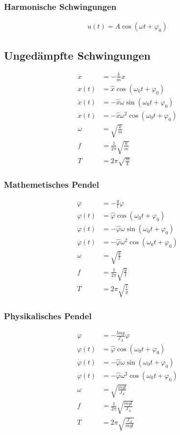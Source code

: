 \subsubsection*{Harmonische Schwingungen}
\begin{align*}
u(t)=A\cos(\omega t+\varphi_0)
\end{align*}


\subsection{Ungedämpfte Schwingungen}

\begin{align*}
\ddot{x}&=-\frac{k}{m}x\\
x(t)&=\hat{x}\cos(\omega_0 t+\varphi_0)\\
\dot{x}(t)&=-\hat{x}\omega\sin(\omega_0 t+\varphi_0)\\
\ddot{x}(t)&=-\hat{x}\omega^2\cos(\omega_0 t+\varphi_0)\\
\omega&=\sqrt{\frac{k}{m}}\\
f&=\frac{1}{2\pi}\sqrt{\frac{k}{m}}\\
T&=2\pi\sqrt{\frac{m}{k}}
\end{align*}

\newpage
\begin{multicols}{2}{}
\subsubsection*{Mathemetisches Pendel}
\begin{align*}
\ddot{\varphi}&=-\frac{g}{l}\varphi\\
\varphi(t)&=\hat{\varphi}\cos(\omega_0 t+\varphi_0)\\
\dot{\varphi}(t)&=-\hat{\varphi}\omega\sin(\omega_0 t+\varphi_0)\\
\ddot{\varphi}(t)&=-\hat{\varphi}\omega^2\cos(\omega_0 t+\varphi_0)\\
\omega&=\sqrt{\frac{g}{l}}\\
f&=\frac{1}{2\pi}\sqrt{\frac{g}{l}}\\
T&=2\pi\sqrt{\frac{l}{g}}
\end{align*}

\subsubsection*{Physikalisches Pendel}
\begin{align*}
\ddot{\varphi}&=-\frac{lmg}{J_A}\varphi\\
\varphi(t)&=\hat{\varphi}\cos(\omega_0 t+\varphi_0)\\
\dot{\varphi}(t)&=-\hat{\varphi}\omega\sin(\omega_0 t+\varphi_0)\\
\ddot{\varphi}(t)&=-\hat{\varphi}\omega^2\cos(\omega_0 t+\varphi_0)\\
\omega&=\sqrt{\frac{mgl}{J_A}}\\
f&=\frac{1}{2\pi}\sqrt{\frac{mgl}{J_A}}\\
T&=2\pi\sqrt{\frac{J_A}{mgl}}
\end{align*}
\end{multicols}

